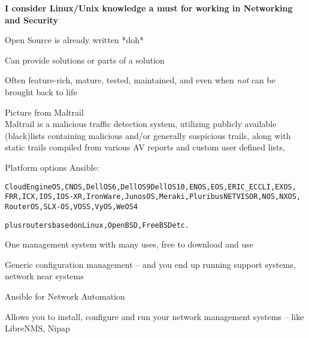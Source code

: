 \documentclass[Screen16to9,17pt]{foils}
\begin{document}

{\bf I consider Linux/Unix knowledge a must for working in Networking and Security}



\begin{list2}
\item Open Source is already written *doh*
\item Can provide solutions or parts of a solution
\item Often feature-rich, mature, tested, maintained, and even when \emph{not} can be brought back to life
\item Picture from Maltrail \\
Maltrail is a malicious traffic detection system, utilizing publicly available (black)lists containing malicious and/or generally suspicious trails, along with static trails compiled from various AV reports and custom user defined lists,
\end{list2}






Platform options Ansible:
\begin{alltt}
CloudEngine OS, CNOS, Dell OS6, Dell OS9 Dell OS10, ENOS, EOS, ERIC_ECCLI, EXOS,
FRR, ICX, IOS, IOS-XR, IronWare, Junos OS, Meraki, Pluribus NETVISOR, NOS, NXOS,
RouterOS, SLX-OS, VOSS, VyOS, WeOS 4

plus routers based on Linux, OpenBSD, FreeBSD etc.
\end{alltt}


One management system with many uses, free to download and use
\begin{list2}
\item Generic configuration management -- and you end up running support systems, network near systems
\item Ansible for Network Automation\\
\item Allows you to install, configure and run your network management systems -- like LibreNMS, Nipap
\end{list2}
\end{document}

